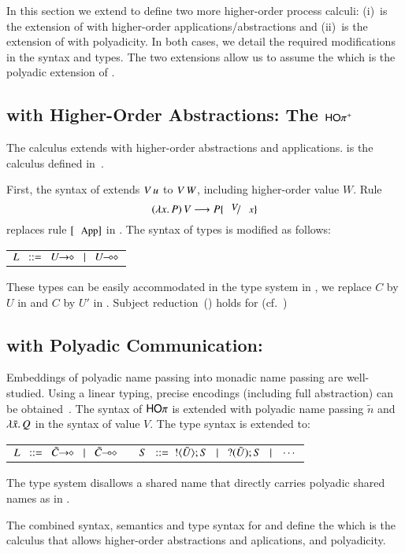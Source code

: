 



In this section we extend \HOp to define two more higher-order
process calculi:
(i)~\HOpp is the extension of \HOp with higher-order applications/abstractions
and 
(ii)~\PHOp is the extension of \HOp
with polyadicity.
In both cases, we detail the
required modifications in the syntax and types.
The two extensions allow us to assume the \PHOpp
which is the polyadic extension of \HOpp.


\subsection{\HOp with Higher-Order Abstractions: The  $\mathsf{HO\pi^{+}}$}
\noi 
The calculus \HOpp 
extends \HOp with higher-order abstractions and applications.
\HOpp is the calculus defined in~\cite{characteristic_bis}.

\noi First, the syntax of  extends 
$V\, {u}$ to $V\, {W}$, including higher-order value $W$. 
Rule 
\[
	\appl{(\abs{x}{P})}{V} \red P \subst{V}{x}
\]
replaces rule $\orule{App}$ in .
The syntax of types is modified as follows: %
%
\begin{center}
	\begin{tabular}{c}
		$L \bnfis \shot{U} \bnfbar \lhot{U}$
	\end{tabular}
\end{center}
These types can be easily accommodated in the type system in , 
we replace $C$ by $U$ in  and $C$ by $U'$ in . Subject
reduction~() holds for \HOpp (cf.~\cite{characteristic_bis})

\subsection{\HOp with Polyadic Communication: \PHOp}

\noi Embeddings of polyadic name passing into monadic name passing are
well-studied. %
Using a linear typing, precise
encodings (including full abstraction) can be obtained~\cite{Yoshida96}.
The syntax of 
$\mathsf{HO}\pi$ is extended with
polyadic name passing $\tilde{n}$ and $\lambda \tilde{x}.\,Q$ in the syntax 
of value $V$. The type syntax is extended to: 
%
\begin{center}
	\begin{tabular}{c}
	$	L \bnfis \shot{\tilde{C}} \bnfbar \lhot{\tilde{C}}
		\quad\quad
		S \bnfis  \btout{\tilde{U}} S \bnfbar \btinp{\tilde{U}} S \bnfbar \cdots$
	\end{tabular}
\end{center}
%
The type system disallows a shared name that directly carries polyadic
shared names as in \cite{tlca07,MostrousY15}.

The combined syntax, semantics and type syntax for \HOpp and \PHOp
define the \PHOpp which is the calculus that allows higher-order
abstractions and aplications, and polyadicity.
